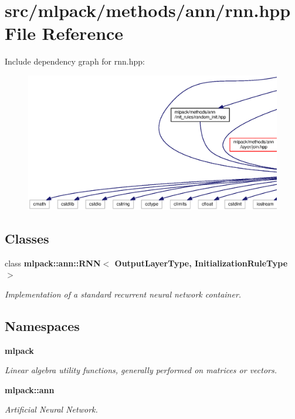 \section{src/mlpack/methods/ann/rnn.hpp File Reference}
\label{rnn_8hpp}
Include dependency graph for rnn.\+hpp\+:
\nopagebreak
\begin{figure}[H]
\begin{center}
\leavevmode
\includegraphics[width=350pt]{rnn_8hpp__incl}
\end{center}
\end{figure}
\subsection*{Classes}
\begin{DoxyCompactItemize}
\item 
class {\bf mlpack\+::ann\+::\+R\+N\+N$<$ Output\+Layer\+Type, Initialization\+Rule\+Type $>$}
\begin{DoxyCompactList}\small\item\em Implementation of a standard recurrent neural network container. \end{DoxyCompactList}\end{DoxyCompactItemize}
\subsection*{Namespaces}
\begin{DoxyCompactItemize}
\item 
 {\bf mlpack}
\begin{DoxyCompactList}\small\item\em Linear algebra utility functions, generally performed on matrices or vectors. \end{DoxyCompactList}\item 
 {\bf mlpack\+::ann}
\begin{DoxyCompactList}\small\item\em Artificial Neural Network. \end{DoxyCompactList}\end{DoxyCompactItemize}


